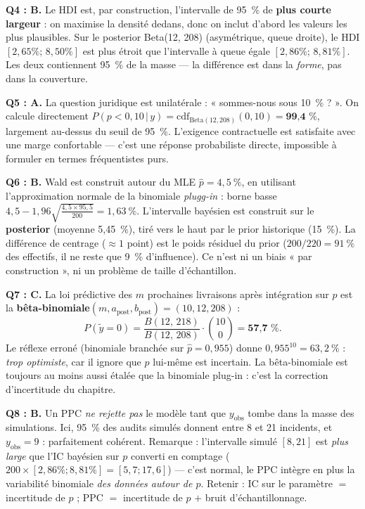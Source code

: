 \documentclass[11pt,a4paper]{article}
\newcommand{\given}{\,\vert\,}
\begin{document}
\begin{corrigebox}
\textbf{Q4 : B.} Le HDI est, par construction, l'intervalle de 95~\% de
\textbf{plus courte largeur} : on maximise la densité dedans, donc on inclut
d'abord les valeurs les plus plausibles. Sur le posterior Beta(12, 208)
(asymétrique, queue droite), le HDI $[2{,}65\%;\, 8{,}50\%]$ est plus étroit que
l'intervalle à queue égale $[2{,}86\%;\, 8{,}81\%]$. Les deux contiennent 95~\%
de la masse --- la différence est dans la \emph{forme}, pas dans la couverture.

\textbf{Q5 : A.} La question juridique est unilatérale : « sommes-nous sous
10~\% ? ». On calcule directement $P(p < 0{,}10 \given y) =
\text{cdf}_{\text{Beta}(12,208)}(0{,}10) = \textbf{99{,}4~\%}$, largement
au-dessus du seuil de 95~\%. L'exigence contractuelle est satisfaite avec
une marge confortable --- c'est une réponse probabiliste directe,
impossible à formuler en termes fréquentistes purs.

\textbf{Q6 : B.} Wald est construit autour du MLE $\hat p = 4{,}5~\%$, en
utilisant l'approximation normale de la binomiale \emph{plugg-in} : borne
basse $4{,}5 - 1{,}96\sqrt{\frac{4{,}5 \times 95{,}5}{200}} = 1{,}63~\%$.
L'intervalle bayésien est construit sur le \textbf{posterior} (moyenne
5,45~\%), tiré vers le haut par le prior historique (15~\%). La différence
de centrage ($\approx 1$ point) est le poids résiduel du prior
($200/220 = 91~\%$ des effectifs, il ne reste que 9~\% d'influence).
Ce n'est ni un biais « par construction », ni un problème de taille
d'échantillon.
\end{corrigebox}

\begin{corrigebox}
\textbf{Q7 : C.} La loi prédictive des $m$ prochaines livraisons après
intégration sur $p$ est la \textbf{bêta-binomiale}$(m, a_{\text{post}},
b_{\text{post}}) = (10, 12, 208)$ :
\[
P(\tilde y = 0) = \frac{B(12,\, 218)}{B(12,\, 208)} \cdot \binom{10}{0}
= \textbf{57{,}7~\%}.
\]
Le réflexe erroné (binomiale branchée sur $\hat p = 0{,}955$) donne
$0{,}955^{10} = 63{,}2~\%$ : \emph{trop optimiste}, car il ignore que $p$
lui-même est incertain. La bêta-binomiale est toujours au moins aussi étalée
que la binomiale plug-in : c'est la correction d'incertitude du chapitre.

\textbf{Q8 : B.} Un PPC \emph{ne rejette pas} le modèle tant que
$y_{\text{obs}}$ tombe dans la masse des simulations. Ici, 95~\% des audits
simulés donnent entre 8 et 21 incidents, et $y_{\text{obs}} = 9$ : parfaitement
cohérent. Remarque : l'intervalle simulé $[8, 21]$ est \emph{plus large} que
l'IC bayésien sur $p$ converti en comptage ($200 \times [2{,}86\%; 8{,}81\%]
= [5{,}7; 17{,}6]$) --- c'est normal, le PPC intègre en plus la variabilité
binomiale \emph{des données autour de $p$}. Retenir : IC sur le paramètre $=$
incertitude de $p$ ; PPC $=$ incertitude de $p$ $+$ bruit d'échantillonnage.
\end{corrigebox}
\end{document}
